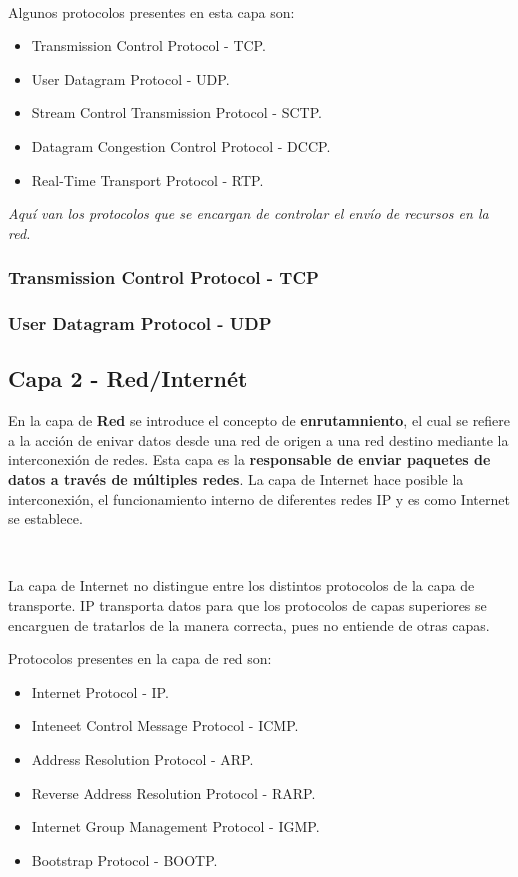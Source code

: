 \documentclass[a4paper,10pt]{article}
\begin{document}
\

Algunos protocolos presentes en esta capa son:

\begin{itemize}
    \item Transmission Control Protocol - TCP.
    \item User Datagram Protocol - UDP.
    \item Stream Control Transmission Protocol - SCTP.
    \item Datagram Congestion Control Protocol - DCCP.
    \item Real-Time Transport Protocol - RTP.
\end{itemize}

\begin{center}
    \textit{Aquí van los protocolos que se encargan de controlar el envío de recursos en la red.}
\end{center}

\subsubsection{Transmission Control Protocol - TCP}


\subsubsection{User Datagram Protocol - UDP}

\subsection{Capa 2 - Red/Internét}

En la capa de \textbf{Red} se introduce el concepto de \textbf{enrutamniento}, el cual se refiere a la acción de enivar datos desde una red de origen a
una red destino mediante la interconexión de redes. Esta capa es la \textbf{responsable de enviar paquetes de datos a través de múltiples redes}. 
La capa de Internet hace posible la interconexión, el funcionamiento interno de diferentes redes IP y es como Internet se establece.

\

La capa de Internet no distingue entre los distintos protocolos de la capa de transporte. IP transporta datos para que los protocolos de capas superiores se encarguen de tratarlos de la manera correcta, pues no entiende de otras capas.
\

Protocolos presentes en la capa de red son:

\begin{itemize}
    \item Internet Protocol - IP.
    \item Inteneet Control Message Protocol - ICMP.
    \item Address Resolution Protocol - ARP.
    \item Reverse Address Resolution Protocol - RARP.
    \item Internet Group Management Protocol - IGMP.
    \item Bootstrap Protocol - BOOTP.
\end{itemize}
\end{document}

